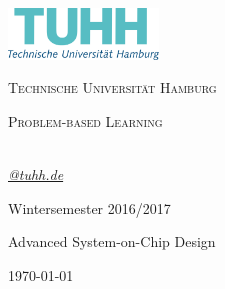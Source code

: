 \begin{titlepage}
	\centering
	\includegraphics[width=0.30\textwidth]{pictures/office_rgb_de.png}\par\vspace{1cm}
	{\scshape\LARGE Technische Universität Hamburg \par}
	\vspace{1cm}
	{\scshape\Large Problem-based Learning\par}
	\vspace{1.5cm}
	{\huge\bfseries \thetitle\par}
	\vspace{2cm}
	{\Large\itshape \theauthor\\\href{mailto:@tuhh.de}{@tuhh.de}\par}
	\vfill	%
	Wintersemester 2016/2017\par
	Advanced System-on-Chip Design
	

	\vfill

	{\large \today\par}
\end{titlepage}


